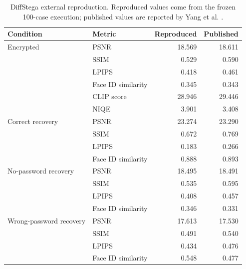 \begin{table}[t]
\caption{DiffStega external reproduction. Reproduced values come from the frozen 100-case execution; published values are reported by Yang et al. \cite{yang2024diffstega}.}
\label{tab:diffstega}
\small
\begin{tabular}{@{}llrr@{}}
\toprule
Condition & Metric & Reproduced & Published \\
\midrule
Encrypted & PSNR & 18.569 & 18.611 \\
          & SSIM & 0.529 & 0.590 \\
          & LPIPS & 0.418 & 0.461 \\
          & Face ID similarity & 0.345 & 0.343 \\
          & CLIP score & 28.946 & 29.446 \\
          & NIQE & 3.901 & 3.408 \\
\midrule
Correct recovery & PSNR & 23.274 & 23.290 \\
                 & SSIM & 0.672 & 0.769 \\
                 & LPIPS & 0.183 & 0.266 \\
                 & Face ID similarity & 0.888 & 0.893 \\
\midrule
No-password recovery & PSNR & 18.495 & 18.491 \\
                     & SSIM & 0.535 & 0.595 \\
                     & LPIPS & 0.408 & 0.457 \\
                     & Face ID similarity & 0.346 & 0.331 \\
\midrule
Wrong-password recovery & PSNR & 17.613 & 17.530 \\
                        & SSIM & 0.491 & 0.540 \\
                        & LPIPS & 0.434 & 0.476 \\
                        & Face ID similarity & 0.548 & 0.477 \\
\bottomrule
\end{tabular}
\end{table}

